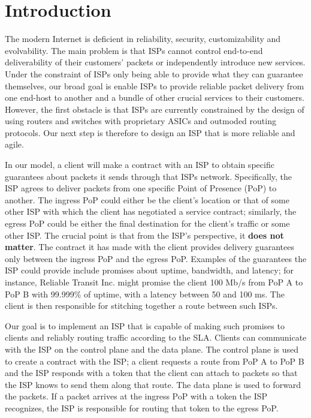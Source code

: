\documentclass{article}
\begin{document}
\section{Introduction}

The modern Internet is deficient in reliability, security,
customizability and evolvability. The main problem is that ISPs cannot
control end-to-end deliverability of their customers' packets or
independently introduce new services. Under the constraint of ISPs
only being able to provide what they can guarantee themselves, our
broad goal is enable ISPs to provide reliable packet delivery from one
end-host to another and a bundle of other crucial services to their
customers. However, the first obstacle is that ISPs are currently
constrained by the design of using routers and switches with
proprietary ASICs and outmoded routing protocols. Our next step is
therefore to design an ISP that is more reliable and agile.

In our model, a client will make a contract with an ISP to obtain
specific guarantees about packets it sends through that ISPs
network. Specifically, the ISP agrees to deliver packets from one
specific Point of Presence (PoP) to another. The ingress PoP could
either be the client's location or that of some other ISP with which
the client has negotiated a service contract; similarly, the egress PoP
could be either the final destination for the client's traffic or some
other ISP. The crucial point is that from the ISP's perspective, it
\textbf{does not matter}. The contract it has made with the client
provides delivery guarantees only between the ingress PoP and the
egress PoP. Examples of the guarantees the ISP could provide include
promises about uptime, bandwidth, and latency; for instance, Reliable
Transit Inc. might promise the client 100 Mb/s from PoP A to PoP B
with 99.999\% of uptime, with a latency between 50 and 100 ms. The client
is then responsible for stitching together a route between such ISPs.

Our goal is to implement an ISP that is capable of making such
promises to clients and reliably routing traffic according to the SLA. Clients can
communicate with the ISP on the control plane and the data plane. The
control plane is used to create a contract with the ISP; a client
requests a route from PoP A to PoP B and the ISP responds with a token
that the client can attach to packets so that the ISP knows to send
them along that route. The data plane is used to forward the
packets. If a packet arrives at the ingress PoP with a token the ISP
recognizes, the ISP is responsible for routing that token to the
egress PoP.
\end{document}
